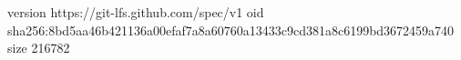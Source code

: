 version https://git-lfs.github.com/spec/v1
oid sha256:8bd5aa46b421136a00efaf7a8a60760a13433c9cd381a8c6199bd3672459a740
size 216782
